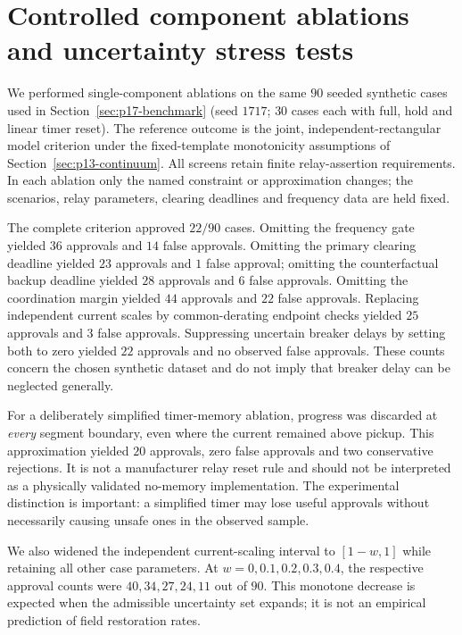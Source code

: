 \section{Controlled component ablations and uncertainty stress tests}
\label{sec:p18-ablation}
We performed single-component ablations on the same \(90\) seeded synthetic cases used in Section~\ref{sec:p17-benchmark} (seed \(1717\); \(30\) cases each with full, hold and linear timer reset). The reference outcome is the joint, independent-rectangular model criterion under the fixed-template monotonicity assumptions of Section~\ref{sec:p13-continuum}. All screens retain finite relay-assertion requirements. In each ablation only the named constraint or approximation changes; the scenarios, relay parameters, clearing deadlines and frequency data are held fixed.

The complete criterion approved \(22/90\) cases. Omitting the frequency gate yielded \(36\) approvals and \(14\) false approvals. Omitting the primary clearing deadline yielded \(23\) approvals and \(1\) false approval; omitting the counterfactual backup deadline yielded \(28\) approvals and \(6\) false approvals. Omitting the coordination margin yielded \(44\) approvals and \(22\) false approvals. Replacing independent current scales by common-derating endpoint checks yielded \(25\) approvals and \(3\) false approvals. Suppressing uncertain breaker delays by setting both to zero yielded \(22\) approvals and no observed false approvals. These counts concern the chosen synthetic dataset and do not imply that breaker delay can be neglected generally.

For a deliberately simplified timer-memory ablation, progress was discarded at \emph{every} segment boundary, even where the current remained above pickup. This approximation yielded \(20\) approvals, zero false approvals and two conservative rejections. It is not a manufacturer relay reset rule and should not be interpreted as a physically validated no-memory implementation. The experimental distinction is important: a simplified timer may lose useful approvals without necessarily causing unsafe ones in the observed sample.

We also widened the independent current-scaling interval to \([1-w,1]\) while retaining all other case parameters. At \(w=0,0.1,0.2,0.3,0.4\), the respective approval counts were \(40,34,27,24,11\) out of \(90\). This monotone decrease is expected when the admissible uncertainty set expands; it is not an empirical prediction of field restoration rates.

